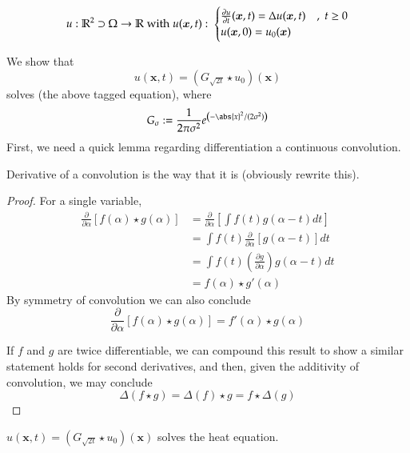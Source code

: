 \begin{equation}
	u: \mathbb{R}^2 \supset \Omega \to \mathbb{R} \; \textrm{with} \; u(\bm{x},t) : \;
		\begin{cases}
			\frac{\partial u}{\partial t} (\bm{x}, t) = \Delta u(\bm{x},t) & ,\; t \ge 0 \\
			u(\bm{x},0) = u_0(\bm{x}) 
		\end{cases}
	\end{equation}

We show that
\begin{equation}
	u(\bm{x},t) = \left(G_{\sqrt{2t}} \star u_0 \right)(\bm{x})
\end{equation}
solves (the above tagged equation), where
\[
	G_\sigma := \frac{1}{2\pi \sigma^2} e^{\left(-\abs{x}^2 / (2\sigma^2)\right)}
\]
First, we need a quick lemma regarding differentiation a continuous convolution.
\begin{lemma} \label{dconvolution}
	Derivative of a convolution is the way that it is (obviously rewrite this).
\end{lemma}
\begin{proof}
	For a single variable,
	\begin{align}
	\frac{\partial}{\partial \alpha} \left[ f(\alpha) \star g(\alpha) \right]
	&= \frac{\partial}{\partial \alpha} \left[ 
	\int f(t) g(\alpha - t) dt \right] \\
	&=  \int f(t) \frac{\partial}{\partial \alpha}\left[ g(\alpha - t)  \right] dt \\
	&=  \int f(t) \left(\frac{\partial g}{\partial \alpha}\right) g(\alpha - t) dt \\
	&=  f(\alpha) \star g'(\alpha)
	\end{align}
	By symmetry of convolution we can also conclude 
	\[\frac{\partial}{\partial \alpha} \left[ f(\alpha) \star g(\alpha) \right]
	= f'(\alpha) \star g(\alpha)
	\]
	
	If $f$ and $g$ are twice differentiable, we can compound this result to show a similar statement holds for second derivatives, and then, given the additivity of convolution,
	we may conclude
	\begin{equation}
	\Delta \left(f \star g \right) = \Delta(f) \star g = f \star \Delta(g) 
	\end{equation} 
\end{proof}
\begin{theorem}
	$u(\bm{x},t) = \left(G_{\sqrt{2t}} \star u_0 \right)(\bm{x})$ solves the heat equation.
\end{theorem}

